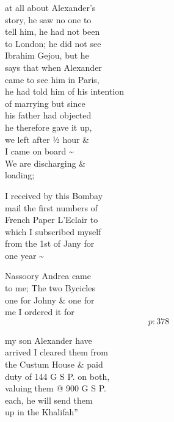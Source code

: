 \documentclass{report}
\begin{document}
	\par{
 	at all about Alexander’s\ \\story, he saw no one to\ \\tell him, he had not been\ \\to London; he did not see\ \\Ibrahim Gejou, but he\ \\says that when Alexander\ \\came to see him in Paris,\ \\he had told him of his intention\ \\of marrying but since\ \\his father had objected\ \\he therefore gave it up,\ \\we left after ½ hour \&\ \\I came on board \~{}\ \\We are discharging \&\ \\loading;\ \\
	}

	\par{
 	I received by this Bombay\ \\mail the first numbers of\ \\French Paper L’Eclair to\ \\which I subscribed myself\ \\from the 1st of Jany for\ \\one year \~{}\ \\
	}

	\par{
 	Nassoory Andrea came\ \\to me; The two Bycicles\ \\one for Johny \& one for\ \\me I ordered it for\ \\
  \[p: 378 \]

	}


	\par{
 	my son Alexander have\ \\arrived I cleared them from\ \\the Custum House \& paid\ \\duty of 144 G S P. on both,\ \\valuing them @ 900 G S P.\ \\each, he will send them\ \\up in the Khalifah”\ \\
	}
\end{document}
